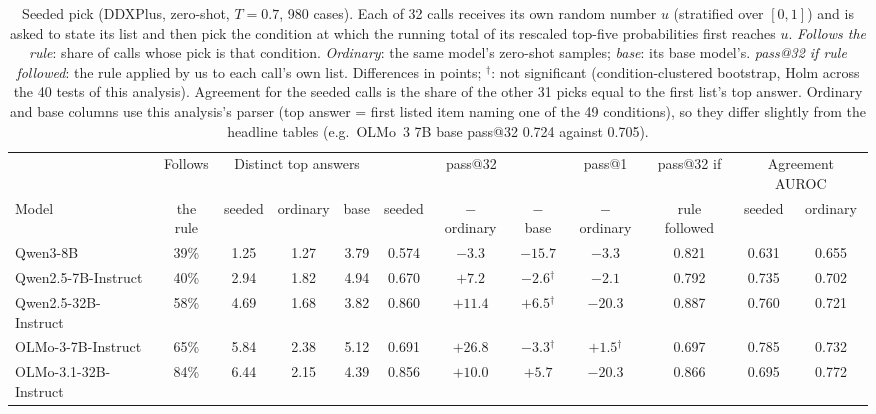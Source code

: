 \documentclass[11pt]{article}
\begin{document}
\begin{table}[t]
\centering\small
\setlength{\tabcolsep}{3.5pt}
\begin{adjustbox}{max width=\linewidth}
\begin{tabular}{lccccccccccc}
\toprule
 & Follows & \multicolumn{3}{c}{Distinct top answers} & \multicolumn{3}{c}{pass@32} & pass@1 & pass@32 if & \multicolumn{2}{c}{Agreement AUROC} \\
Model & the rule & seeded & ordinary & base & seeded & $-$ ordinary & $-$ base & $-$ ordinary & rule followed & seeded & ordinary \\
\midrule
Qwen3-8B & 39\% & 1.25 & 1.27 & 3.79 & 0.574 & $-3.3$ & $-15.7$ & $-3.3$ & 0.821 & 0.631 & 0.655 \\
Qwen2.5-7B-Instruct & 40\% & 2.94 & 1.82 & 4.94 & 0.670 & $+7.2$ & $-2.6$$^{\dagger}$ & $-2.1$ & 0.792 & 0.735 & 0.702 \\
Qwen2.5-32B-Instruct & 58\% & 4.69 & 1.68 & 3.82 & 0.860 & $+11.4$ & $+6.5$$^{\dagger}$ & $-20.3$ & 0.887 & 0.760 & 0.721 \\
OLMo-3-7B-Instruct & 65\% & 5.84 & 2.38 & 5.12 & 0.691 & $+26.8$ & $-3.3$$^{\dagger}$ & $+1.5$$^{\dagger}$ & 0.697 & 0.785 & 0.732 \\
OLMo-3.1-32B-Instruct & 84\% & 6.44 & 2.15 & 4.39 & 0.856 & $+10.0$ & $+5.7$ & $-20.3$ & 0.866 & 0.695 & 0.772 \\
\bottomrule
\end{tabular}
\end{adjustbox}
\caption{Seeded pick (DDXPlus, zero-shot, $T{=}0.7$, 980 cases). Each of 32 calls receives its own random number $u$ (stratified over $[0,1]$) and is asked to state its list and then pick the condition at which the running total of its rescaled top-five probabilities first reaches $u$. \emph{Follows the rule}: share of calls whose pick is that condition. \emph{Ordinary}: the same model's zero-shot samples; \emph{base}: its base model's. \emph{pass@32 if rule followed}: the rule applied by us to each call's own list. Differences in points; $^{\dagger}$: not significant (condition-clustered bootstrap, Holm across the 40 tests of this analysis). Agreement for the seeded calls is the share of the other 31 picks equal to the first list's top answer. Ordinary and base columns use this analysis's parser (top answer = first listed item naming one of the 49 conditions), so they differ slightly from the headline tables (e.g.\ OLMo~3 7B base pass@32 0.724 against 0.705).}
\label{tab:seeded}
\end{table}
\end{document}
